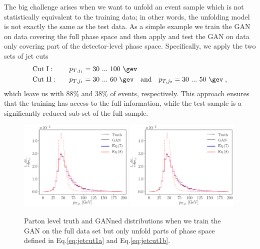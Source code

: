 The big challenge arises when we want to unfold an event sample which is not
statistically equivalent to the training data; in other words, the
unfolding model is not exactly the same as the test data. As a simple
example we train the GAN on data covering the full phase space and
then apply and test the GAN on data only covering part of the
detector-level phase space. Specifically, we apply the two sets of jet
cuts
%
\begin{alignat}{5}
&\text{Cut I}: & \quad
p_{T,j_1} &= 30~...~100~\gev
\label{eq:jetcut1a} \\
&\text{Cut II}: & \quad
p_{T,j_1} &= 30~...~60~\gev \quad \text{and} \quad p_{T,j_2} = 30~...~50~\gev \; ,
\label{eq:jetcut1b}
\end{alignat}
%
which leave us with 88\% and 38\% of events, respectively. This
approach ensures that the training has access to the full information,
while the test sample is a significantly reduced sub-set of the full
sample.

\begin{figure}[t]
\centering
\includegraphics[page = 1, width=0.49\textwidth]{figures/cGAN/GAN_overlap}
\includegraphics[page = 2, width=0.49\textwidth]{figures/cGAN/GAN_overlap}
\caption{Parton level truth and GANned distributions when we train the
  GAN on the full data set but only unfold parts of phase space
  defined in Eq.\eqref{eq:jetcut1a} and Eq.\eqref{eq:jetcut1b}.}
\label{fig:distributions_GAN_sliced}
\end{figure}

